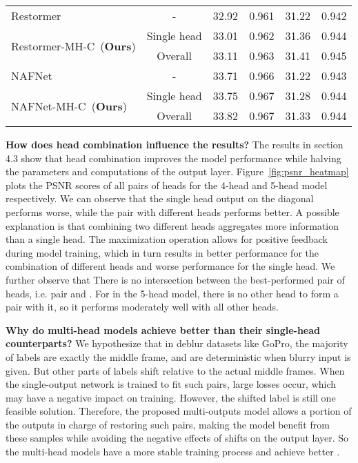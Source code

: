 \documentclass[letterpaper]{article} \usepackage{aaai23}  \usepackage{times}  \usepackage{helvet}  \usepackage{courier}  \usepackage[hyphens]{url}  \usepackage{graphicx} \urlstyle{rm} \def\UrlFont{\rm}  \usepackage{natbib}  \usepackage{caption} \frenchspacing  \setlength{\pdfpagewidth}{8.5in} \setlength{\pdfpageheight}{11in} \usepackage{algorithm}
\begin{document}
\begin{table*}[t]
\begin{tabular}{l|c|ll|ll}
Restormer~\cite{zamir2022restormer}            &           - & 32.92 & 0.961 & 31.22 & 0.942 \\ \multirow{2}{*}{Restormer-MH-C~(\textbf{Ours})}& Single head & 33.01 & 0.962 & 31.36 & 0.944 \\ &     Overall & 33.11 & 0.963 & 31.41 & 0.945 \\ \midrule
NAFNet~\cite{chen2022simple}                   &           - & 33.71 & 0.966 & 31.22 & 0.943 \\ \multirow{2}{*}{NAFNet-MH-C~(\textbf{Ours})}   & Single head & 33.75 & 0.967 & 31.28 & 0.944 \\ &     Overall & 33.82 & 0.967 & 31.33 & 0.944 \\ \bottomrule
\end{tabular}\end{table*}


\textbf{How does head combination influence the results?} The results in section 4.3 show that head combination improves the model performance while halving the parameters and computations of the output layer. Figure~\ref{fig:psnr_heatmap} plots the PSNR scores of all pairs of heads for the 4-head and 5-head model respectively. We can observe that the single head output on the diagonal performs worse, while the pair with different heads performs better. A possible explanation is that combining two different heads aggregates more information than a single head. The maximization operation allows for positive feedback during model training, which in turn results in better performance for the combination of different heads and worse performance for the single head. We further observe that There is no intersection between the best-performed pair of heads, i.e. pair  and . For  in the 5-head model, there is no other head to form a pair with it, so it performs moderately well with all other heads.

\textbf{Why do multi-head models achieve better  than their single-head counterparts?} We hypothesize that in deblur datasets like GoPro, the majority of labels are exactly the middle frame, and are deterministic when blurry input is given. But other parts of labels shift relative to the actual middle frames. When the single-output network is trained to fit such pairs, large losses occur, which may have a negative impact on training. However, the shifted label is still one feasible solution. Therefore, the proposed multi-outputs model allows a portion of the outputs in charge of restoring such pairs, making the model benefit from these samples while avoiding the negative effects of shifts on the output layer. So the multi-head models have a more stable training process and achieve better .
\end{document}
